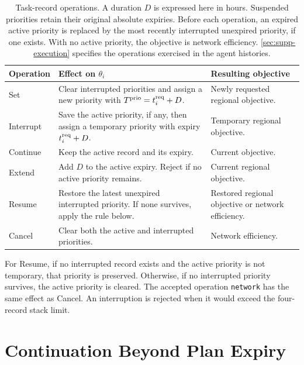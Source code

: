 \documentclass[preprint,12pt]{elsarticle}
\theoremstyle{definition}
\theoremstyle{plain}
\theoremstyle{definition}
\theoremstyle{plain}
\newcommand{\appref}[1]{\ref{#1}}
\begin{document}
\begin{table}[H]
\centering\small
\caption{Task-record operations. A duration $D$ is expressed here in
hours. Suspended priorities retain their original absolute expiries.
Before each operation, an expired active priority is replaced by the
most recently interrupted unexpired priority, if one exists. With no
active priority, the objective is network efficiency. \appref{sec:supp-execution} specifies the operations exercised in
the agent histories.}
\label{tab:task-operations}
\begin{tabularx}{\textwidth}{@{}l>{\raggedright\arraybackslash}X>{\raggedright\arraybackslash}X@{}}
\toprule
Operation & Effect on $\theta_i$ & Resulting objective\\
\midrule
Set & Clear interrupted priorities and assign a new priority with
$T^{\rm prio}=t_i^{\rm req}+D$. & Newly requested regional objective.\\
Interrupt & Save the active priority, if any, then assign a temporary
priority with expiry $t_i^{\rm req}+D$. & Temporary regional objective.\\
Continue & Keep the active record and its expiry. & Current objective.\\
Extend & Add $D$ to the active expiry. Reject if no active priority
remains. & Current regional objective.\\
Resume & Restore the latest unexpired interrupted priority. If none
survives, apply the rule below. & Restored regional objective or network
efficiency.\\
Cancel & Clear both the active and interrupted priorities. & Network
efficiency.\\
\bottomrule
\end{tabularx}
\par\smallskip\raggedright\footnotesize
For Resume, if no interrupted record exists and the active priority is
not temporary, that priority is preserved. Otherwise, if no interrupted
priority survives, the active priority is cleared. The accepted operation \texttt{network} has the same effect as Cancel.
An interruption is rejected when it would exceed the four-record stack
limit.
\end{table}

\section{Continuation Beyond Plan Expiry}
\label{sec:terminal-backup-main}
\label{sec:terminal-backup}
\end{document}
